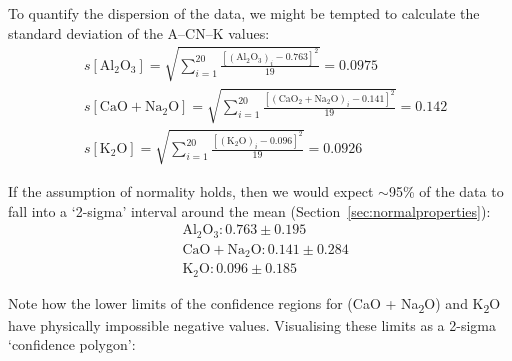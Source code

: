 To quantify the dispersion of the data, we might be tempted to
calculate the standard deviation of the A--CN--K values:
\[
\begin{split}
  &s[\mbox{Al}_2\mbox{O}_3] =
  \sqrt{\sum\limits_{i=1}^{20}
    \frac{\left[(\mbox{Al}_2\mbox{O}_3)_i - 0.763\right]^2}{19}} = 0.0975 \\
  &s[\mbox{CaO} + \mbox{Na}_2\mbox{O}] =
  \sqrt{\sum\limits_{i=1}^{20}
    \frac{\left[(\mbox{CaO}_2+\mbox{Na}_2\mbox{O})_i - 0.141\right]^2}{19} } = 0.142 \\
  &s[\mbox{K}_2\mbox{O}] =
  \sqrt{\sum\limits_{i=1}^{20}
    \frac{\left[(\mbox{K}_2\mbox{O})_i - 0.096\right]^2}{19}} = 0.0926
\end{split}
\]

If the assumption of normality holds, then we would expect $\sim$95\%
of the data to fall into a `2-sigma' interval around the mean
(Section~\ref{sec:normalproperties}):
\[
\begin{split}
  &\mbox{Al}_2\mbox{O}_3: 0.763 \pm 0.195 \\
  &\mbox{CaO} + \mbox{Na}_2\mbox{O}: 0.141 \pm 0.284 \\
  &\mbox{K}_2\mbox{O}: 0.096 \pm 0.185
\end{split}
\]

Note how the lower limits of the confidence regions for (CaO +
Na\textsubscript{2}O) and K\textsubscript{2}O have physically
impossible negative values. Visualising these limits as a 2-sigma
`confidence polygon':

